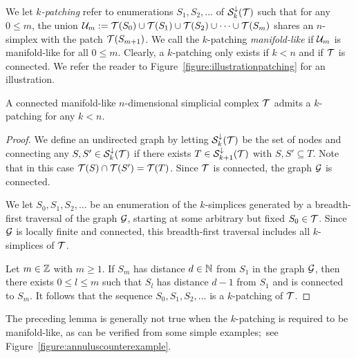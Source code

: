 \documentclass[a4paper]{article}
\begin{document}
We let \emph{$k$-patching} refer to enumerations $S_1, S_2, \dots$ of ${\mathcal S}^{\downarrow}_{k}({\mathcal T})$
such that for any $0 \leq m$, the union 
${\mathcal U}_{m} := {\mathcal T}(S_0) \cup {\mathcal T}(S_1) \cup {\mathcal T}(S_2) \cup \dots \cup {\mathcal T}(S_m)$
shares an $n$-simplex with the patch ${\mathcal T}(S_{m+1})$.
We call the $k$-patching \emph{manifold-like} if ${\mathcal U}_{m}$ is manifold-like for all $0 \leq m$.
Clearly, a $k$-patching only exists if $k < n$ and if ${\mathcal T}$ is connected. 
We refer the reader to Figure~\ref{figure:illustrationpatching} for an illustration.

\begin{lemma}
    A connected manifold-like $n$-dimensional simplicial complex ${\mathcal T}$ admits a $k$-patching for any $k < n$.
\end{lemma}
\begin{proof}
    We define an undirected graph by letting ${\mathcal S}^{\downarrow}_{k}({\mathcal T})$ be the set of nodes 
    and connecting any $S, S' \in {\mathcal S}^{\downarrow}_{k}({\mathcal T})$ if there exists $T \in {\mathcal S}^{\downarrow}_{k+1}({\mathcal T})$ with $S, S' \subseteq T$. 
    Note that in this case ${\mathcal T}(S) \cap {\mathcal T}(S') = {\mathcal T}(T)$. 
    Since ${\mathcal T}$ is connected, the graph ${\mathcal G}$ is connected. 
    
    We let $S_0, S_1, S_2, \dots$ be an enumeration of the $k$-simplices generated by a breadth-first traversal of the graph ${\mathcal G}$,
    starting at some arbitrary but fixed $S_0 \in {\mathcal T}$. 
    Since ${\mathcal G}$ is locally finite and connected, 
    this breadth-first traversal includes all $k$-simplices of ${\mathcal T}$.
    
    Let $m \in {\mathbb Z}$ with $m \geq 1$. If $S_m$ has distance $d \in {\mathbb N}$ from $S_1$ in the graph ${\mathcal G}$,
    then there exists $0 \leq l \leq m$ such that $S_l$ has distance $d-1$ from $S_1$ and is connected to $S_m$. 
    It follows that the sequence $S_0, S_1, S_2, \dots$ is a $k$-patching of ${\mathcal T}$. 
\end{proof}

The preceding lemma is generally not true when the $k$-patching is required to be manifold-like,
as can be verified from some simple examples;~see Figure~\ref{figure:annuluscounterexample}.
\end{document}
